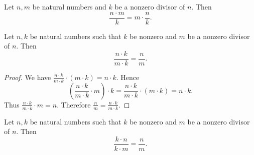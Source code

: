 \documentclass[10pt]{article}
\begin{document}
  \begin{forthel}
    \begin{corollary}
      Let $n, m$ be natural numbers and $k$ be a nonzero divisor of $n$.
      Then \[\frac{n \cdot m}{k} = m \cdot \frac{n}{k}.\]
    \end{corollary}
  \end{forthel}

  \begin{forthel}
    \begin{proposition}
      Let $n, k$ be natural numbers such that $k$ be nonzero and $m$ be a nonzero divisor of $n$.
      Then \[\frac{n \cdot k}{m \cdot k} = \frac{n}{m}.\]
    \end{proposition}
    \begin{proof}
      We have $\frac{n \cdot k}{m \cdot k} \cdot (m \cdot k) = n \cdot k$.
      Hence
      \[  \left( \frac{n \cdot k}{m \cdot k} \cdot m \right) \cdot k
          = \frac{n \cdot k}{m \cdot k} \cdot (m \cdot k)
          = n \cdot k. \]
      Thus $\frac{n \cdot k}{m \cdot k} \cdot m = n$.
      Therefore $\frac{n}{m} = \frac{n \cdot k}{m \cdot k}$.
    \end{proof}
  \end{forthel}

  \begin{forthel}
    \begin{corollary}
      Let $n, k$ be natural numbers such that $k$ be nonzero and $m$ be a nonzero divisor of $n$.
      Then \[\frac{k \cdot n}{k \cdot m} = \frac{n}{m}.\]
    \end{corollary}
  \end{forthel}
\end{document}
